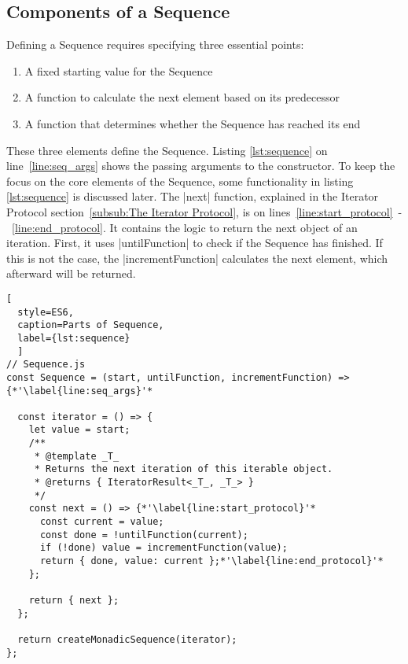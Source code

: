 \subsection{Components of a Sequence}
\label{sub:Components of a Sequence}
Defining a Sequence requires specifying three essential points:
\begin{enumerate}
  \item{A fixed starting value for the Sequence} 
  \item{A function to calculate the next element based on its predecessor} 
  \item{A function that determines whether the Sequence has reached its end} 
\end{enumerate}
These three elements define the Sequence. Listing \ref{lst:sequence} on
line~\ref{line:seq_args} shows the passing arguments to the constructor.
To keep the focus on the core elements of the Sequence, some functionality in 
listing \ref{lst:sequence} is discussed later. The |next| function, explained in 
the Iterator Protocol section~\ref{subsub:The Iterator Protocol}, 
is on lines~\ref{line:start_protocol}~-~\ref{line:end_protocol}. It contains the 
logic to return the next object of an iteration. First, it uses |untilFunction| 
to check if the Sequence has finished. If this is not the case, the
|incrementFunction| calculates the next element, which afterward will be
returned.

\begin{lstlisting}[
  style=ES6, 
  caption=Parts of Sequence,
  label={lst:sequence}
  ]
// Sequence.js
const Sequence = (start, untilFunction, incrementFunction) => {*'\label{line:seq_args}'*

  const iterator = () => {
    let value = start;
    /**
     * @template _T_
     * Returns the next iteration of this iterable object.
     * @returns { IteratorResult<_T_, _T_> }
     */
    const next = () => {*'\label{line:start_protocol}'*
      const current = value;
      const done = !untilFunction(current);
      if (!done) value = incrementFunction(value);
      return { done, value: current };*'\label{line:end_protocol}'*
    };

    return { next };
  };

  return createMonadicSequence(iterator);
};
\end{lstlisting}


